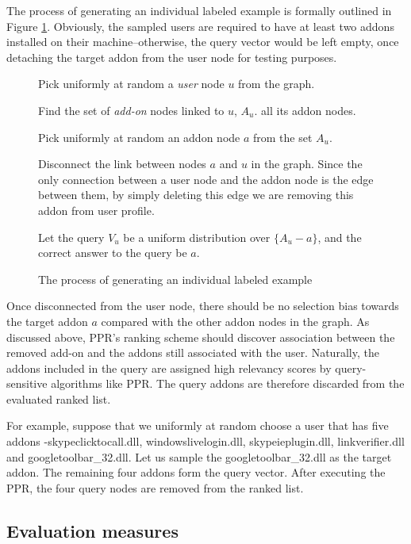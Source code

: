 \documentclass[11pt,oneside]{book}
\let\Oldsubsection\subsection
\renewcommand{\subsection}{\FloatBarrier\Oldsubsection}
\begin{document}
The process of generating an individual labeled example is formally outlined in Figure \ref{fig:example-gen}. Obviously, the sampled users are required to have at least two addons installed on their machine--otherwise, the query vector would be left empty, once detaching the target addon from the user node for testing purposes. 

\begin{figure}
\begin{enumerate}[(a)]
\begin{small}
\item Pick uniformly at random a {\it user} node $u$ from the graph.
\item Find the set of {\it add-on} nodes linked to $u$, $A_u$.
  all its addon nodes.
\item Pick uniformly at random an addon node $a$ from the set $A_u$. 
\item Disconnect the link between nodes $a$ and $u$ in the
  graph. Since the only connection between a user node and the addon
  node is the edge between them, by simply deleting this edge we are
  removing this addon from user profile.
\item Let the query $V_u$ be a uniform distribution over $\{A_u-a\}$,
  and the correct answer to the query be $a$. 
\end{small}
\end{enumerate}
\caption{The process of generating an individual labeled example}
\label{fig:example-gen}
\end{figure}

Once disconnected from the user node, there should be no selection bias towards the target addon $a$ compared with the other addon nodes in the graph. As discussed above, PPR's ranking scheme should discover association between the removed add-on and the addons still associated with the user. Naturally, the addons included in the query are assigned high relevancy scores by query-sensitive algorithms like PPR. The query addons are therefore discarded from the evaluated ranked list. 

For example, suppose that we uniformly at random choose a user that has five addons -skypeclicktocall.dll, windowslivelogin.dll, skypeieplugin.dll, linkverifier.dll and googletoolbar\_32.dll. Let us sample the googletoolbar\_32.dll as the target addon. The remaining four addons form the query vector. After executing the PPR, the four query nodes are removed from the ranked list.

\subsection{Evaluation measures}
\end{document}
